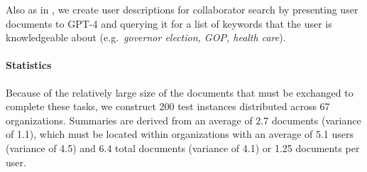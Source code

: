 Also as in \dataspider{}, we create user descriptions for collaborator search  by presenting user documents to GPT-4 and querying it for a list of keywords that the user is knowledgeable about (e.g.\ \emph{governor election, GOP, health care}).

\paragraph{Statistics}

Because of the relatively large size of the documents that must be exchanged to complete these tasks, we construct 200 test instances distributed across 67 organizations.
Summaries are derived from an average of 2.7 documents (variance of 1.1), which must be located within organizations with an average of 5.1 users (variance of 4.5) and 6.4 total documents (variance of 4.1) or 1.25 documents per user.

